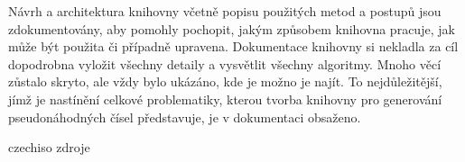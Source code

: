 \documentclass[a4paper,11pt]{article}
\begin{document}
Návrh a architektura knihovny včetně popisu použitých metod a postupů jsou zdokumentovány, aby pomohly pochopit, jakým způsobem knihovna pracuje, jak může být použita či případně upravena. Dokumentace knihovny si nekladla za cíl dopodrobna vyložit všechny detaily a vysvětlit všechny algoritmy. Mnoho věcí zůstalo skryto, ale vždy bylo ukázáno, kde je možno je najít. To nejdůležitější, jímž je nastínění celkové problematiky, kterou tvorba knihovny pro generování pseudonáhodných čísel představuje, je v dokumentaci obsaženo.

\newpage
\renewcommand{\refname}{Bibliografie}
 {czechiso}
 {zdroje}
\end{document}

